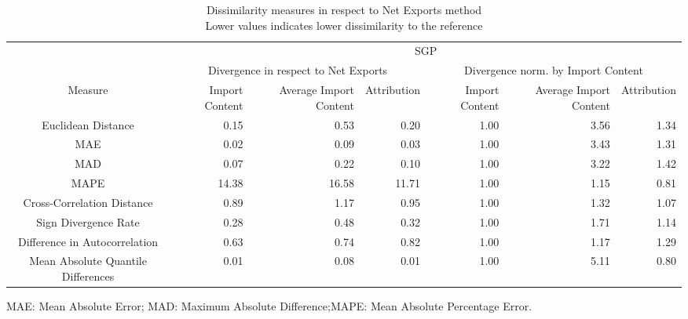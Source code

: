 \begin{table}[t]
\caption*{
{\large Dissimilarity measures in respect to Net Exports method} \\ 
{\small Lower values indicates lower dissimilarity to the reference}
} 
\fontsize{15.0pt}{18.0pt}\selectfont
\begin{tabular*}{\linewidth}{@{\extracolsep{\fill}}crrrrrr}
\toprule
 & \multicolumn{6}{c}{SGP} \\ 
\cmidrule(lr){2-7}
 & \multicolumn{3}{c}{Divergence in respect to Net Exports} & \multicolumn{3}{c}{Divergence norm. by Import Content} \\ 
\cmidrule(lr){2-4} \cmidrule(lr){5-7}
Measure & Import Content & Average Import Content & Attribution & Import Content & Average Import Content & Attribution \\ 
\midrule\addlinespace[2.5pt]
Euclidean Distance & 0.15 & 0.53 & 0.20 & 1.00 & 3.56 & 1.34 \\ 
MAE & 0.02 & 0.09 & 0.03 & 1.00 & 3.43 & 1.31 \\ 
MAD & 0.07 & 0.22 & 0.10 & 1.00 & 3.22 & 1.42 \\ 
MAPE & 14.38 & 16.58 & 11.71 & 1.00 & 1.15 & 0.81 \\ 
Cross-Correlation Distance & 0.89 & 1.17 & 0.95 & 1.00 & 1.32 & 1.07 \\ 
Sign Divergence Rate & 0.28 & 0.48 & 0.32 & 1.00 & 1.71 & 1.14 \\ 
Difference in Autocorrelation & 0.63 & 0.74 & 0.82 & 1.00 & 1.17 & 1.29 \\ 
Mean Absolute Quantile Differences & 0.01 & 0.08 & 0.01 & 1.00 & 5.11 & 0.80 \\ 
\bottomrule
\end{tabular*}
\begin{minipage}{\linewidth}
MAE: Mean Absolute Error; MAD: Maximum Absolute Difference;MAPE: Mean Absolute Percentage Error.\\
\end{minipage}
\end{table}

